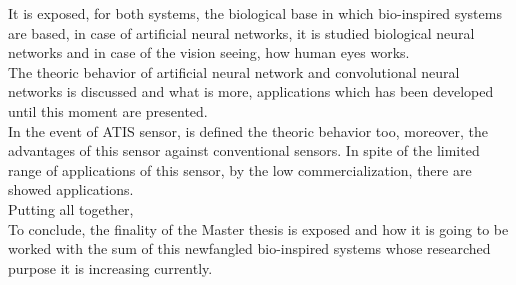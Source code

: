 \documentclass[12pt,a4paper,titlepage,twoside]{book}
\begin{document}
It is exposed, for both systems, the biological base in which bio-inspired systems are based, in case of artificial neural networks, it is studied biological neural networks and in case of the vision seeing, how human eyes works.\\

The theoric behavior of artificial neural network and convolutional neural networks is discussed and what is more, applications which has been developed until this moment are presented.\\

In the event of ATIS sensor, is defined the theoric behavior too, moreover, the advantages of this sensor against conventional sensors. In spite of the limited range of applications of this sensor, by the low commercialization, there are showed applications.\\
Putting all together,\\

To conclude, the finality of the Master thesis is exposed and how it is going to be worked with the sum of this newfangled bio-inspired systems whose researched purpose it is increasing currently.\\



\tableofcontents %





\mainmatter
	

	
	
	\label{cap:teoria}
	






\fancyhead[RO]{} %
\listoffigures 	%
\end{document}
